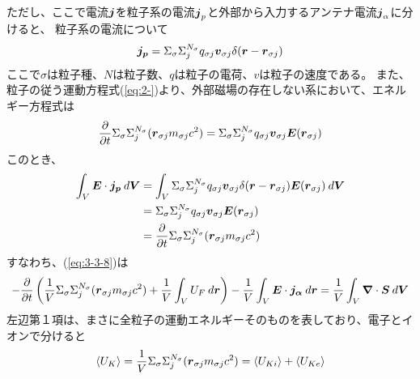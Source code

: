 \documentclass[a4paper,11pt,titlepage]{jarticle}
\newcommand{\bm}[1]{{\mbox{\boldmath $#1$}}}
\numberwithin{equation}{section} %
\begin{document}
  ただし、ここで電流$\bm{j}$を粒子系の電流$\bm{j}_p$と外部から入力するアンテナ電流$\bm{j}_\alpha$に分けると、
  粒子系の電流について
  \begin{equation}
    \label{eq:3-3-9}
    \bm{j_p} = \Sigma_\sigma \Sigma_j^{N_\sigma} q_{\sigma j} \bm{v}_{\sigma j}\delta(\bm{r}-\bm{r}_{\sigma j})
  \end{equation}
  ここで$\sigma$は粒子種、$N$は粒子数、$q$は粒子の電荷、$v$は粒子の速度である。
  また、粒子の従う運動方程式(\ref{eq:2-})より、外部磁場の存在しない系において、エネルギー方程式は
  \begin{equation}
    \label{eq:3-3-10}
      \frac{\partial}{\partial t} \Sigma_\sigma \Sigma_j^{N_\sigma} ( \bm{r}_{\sigma j} m_{\sigma j} c^2 ) 
      = \Sigma_\sigma \Sigma_j^{N_\sigma} q_{\sigma j} \bm{v}_{\sigma j} \bm{E}(\bm{r}_{\sigma j})
  \end{equation}
  このとき、
  \begin{align}
    \label{eq:3-3-11}
    \nonumber
    \int_V \bm{E} \cdot \bm{j_p} \: d\bm{V}  &= \int_V \Sigma_\sigma \Sigma_j^{N_\sigma} q_{\sigma j} \bm{v}_{\sigma j}\delta(\bm{r}-\bm{r}_{\sigma j}) \bm{E}(\bm{r}_{\sigma j})\: d\bm{V} \\
    \nonumber
          &= \Sigma_\sigma \Sigma_j^{N_\sigma} q_{\sigma j} \bm{v}_{\sigma j} \bm{E}(\bm{r}_{\sigma j})  \\
    &= \frac{\partial}{\partial t} \Sigma_\sigma \Sigma_j^{N_\sigma} ( \bm{r}_{\sigma j} m_{\sigma j} c^2 )
  \end{align}
  すなわち、(\ref{eq:3-3-8})は
  \begin{equation}
    \label{eq:3-3-12}
    - \frac{\partial}{\partial t} \left( \frac{1}{V} \Sigma_\sigma \Sigma_j^{N_\sigma} ( \bm{r}_{\sigma j} m_{\sigma j} c^2 ) 
    + \frac{1}{V} \int_V U_F \: d\bm{r}  \right) - \frac{1}{V} \int_V \bm{E} \cdot \bm{j_\alpha} \: d\bm{r} 
    = \frac{1}{V} \int_V \bm{\nabla} \cdot \bm{S} \: d\bm{V}
  \end{equation}
  左辺第１項は、まさに全粒子の運動エネルギーそのものを表しており、電子とイオンで分けると
  \begin{equation}
    \label{eq:3-3-13}
      \ev{U_K} = \frac{1}{V} \Sigma_\sigma \Sigma_j^{N_\sigma} ( \bm{r}_{\sigma j} m_{\sigma j} c^2 )
      = \ev{U_{Ki}} + \ev{U_{Ke}} 
  \end{equation}
\end{document}
